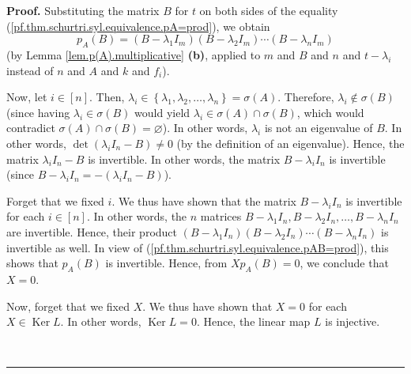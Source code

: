 \documentclass[numbers=enddot,12pt,final,onecolumn,notitlepage]{scrartcl}%
\numberwithin{exer}{subsection}
\theoremstyle{definition}
\newenvironment{proof}[1][Proof]{\noindent\textbf{#1.} }{\ \rule{0.5em}{0.5em}}
\begin{document}
\begin{proof}
Substituting the matrix $B$ for $t$ on both sides of the equality
(\ref{pf.thm.schurtri.syl.equivalence.pA=prod}), we obtain%
\begin{equation}
p_{A}\left(  B\right)  =\left(  B-\lambda_{1}I_{m}\right)  \left(
B-\lambda_{2}I_{m}\right)  \cdots\left(  B-\lambda_{n}I_{m}\right)
\label{pf.thm.schurtri.syl.equivalence.pAB=prod}%
\end{equation}
(by Lemma \ref{lem.p(A).multiplicative} \textbf{(b)}, applied to $m$ and $B$
and $n$ and $t-\lambda_{i}$ instead of $n$ and $A$ and $k$ and $f_{i}$).

Now, let $i\in\left[  n\right]  $. Then, $\lambda_{i}\in\left\{  \lambda
_{1},\lambda_{2},\ldots,\lambda_{n}\right\}  =\sigma\left(  A\right)  $.
Therefore, $\lambda_{i}\notin\sigma\left(  B\right)  $ (since having
$\lambda_{i}\in\sigma\left(  B\right)  $ would yield $\lambda_{i}\in
\sigma\left(  A\right)  \cap\sigma\left(  B\right)  $, which would contradict
$\sigma\left(  A\right)  \cap\sigma\left(  B\right)  =\varnothing$). In other
words, $\lambda_{i}$ is not an eigenvalue of $B$. In other words, $\det\left(
\lambda_{i}I_{n}-B\right)  \neq0$ (by the definition of an eigenvalue). Hence,
the matrix $\lambda_{i}I_{n}-B$ is invertible. In other words, the matrix
$B-\lambda_{i}I_{n}$ is invertible (since $B-\lambda_{i}I_{n}=-\left(
\lambda_{i}I_{n}-B\right)  $).

Forget that we fixed $i$. We thus have shown that the matrix $B-\lambda
_{i}I_{n}$ is invertible for each $i\in\left[  n\right]  $. In other words,
the $n$ matrices $B-\lambda_{1}I_{n},B-\lambda_{2}I_{n},\ldots,B-\lambda
_{n}I_{n}$ are invertible. Hence, their product $\left(  B-\lambda_{1}%
I_{n}\right)  \left(  B-\lambda_{2}I_{n}\right)  \cdots\left(  B-\lambda
_{n}I_{n}\right)  $ is invertible as well. In view of
(\ref{pf.thm.schurtri.syl.equivalence.pAB=prod}), this shows that
$p_{A}\left(  B\right)  $ is invertible. Hence, from $Xp_{A}\left(  B\right)
=0$, we conclude that $X=0$.

Now, forget that we fixed $X$. We thus have shown that $X=0$ for each
$X\in\operatorname*{Ker}L$. In other words, $\operatorname*{Ker}L=0$. Hence,
the linear map $L$ is injective.


\end{proof}
\end{document}
